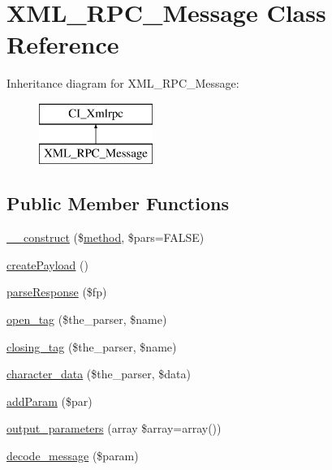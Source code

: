 \hypertarget{class_x_m_l___r_p_c___message}{}\section{X\+M\+L\+\_\+\+R\+P\+C\+\_\+\+Message Class Reference}
\label{class_x_m_l___r_p_c___message}
Inheritance diagram for X\+M\+L\+\_\+\+R\+P\+C\+\_\+\+Message\+:\begin{figure}[H]
\begin{center}
\leavevmode
\includegraphics[height=2.000000cm]{class_x_m_l___r_p_c___message}
\end{center}
\end{figure}
\subsection*{Public Member Functions}
\begin{DoxyCompactItemize}
\item 
\mbox{\hyperlink{class_x_m_l___r_p_c___message_ae3c3f62b3cd527a0c1fb4d45790fd825}{\+\_\+\+\_\+construct}} (\$\mbox{\hyperlink{class_c_i___xmlrpc_afd0597e1ae50c9e3ff42d23dcff82f71}{method}}, \$pars=F\+A\+L\+SE)
\item 
\mbox{\hyperlink{class_x_m_l___r_p_c___message_ac1398abb63f531a8c9ed9093895d9b42}{create\+Payload}} ()
\item 
\mbox{\hyperlink{class_x_m_l___r_p_c___message_a9ba8d8355497c83a5cc812c72c6f3f1d}{parse\+Response}} (\$fp)
\item 
\mbox{\hyperlink{class_x_m_l___r_p_c___message_ac0e9546e114f3888784003d49af0ce83}{open\+\_\+tag}} (\$the\+\_\+parser, \$name)
\item 
\mbox{\hyperlink{class_x_m_l___r_p_c___message_ada6db8b706d06d6a4b5151cbccdc2273}{closing\+\_\+tag}} (\$the\+\_\+parser, \$name)
\item 
\mbox{\hyperlink{class_x_m_l___r_p_c___message_a0fa11561c59ca8a01e7659954efbbb3e}{character\+\_\+data}} (\$the\+\_\+parser, \$data)
\item 
\mbox{\hyperlink{class_x_m_l___r_p_c___message_a2766a886f60c93f471ee0f11ae0d8729}{add\+Param}} (\$par)
\item 
\mbox{\hyperlink{class_x_m_l___r_p_c___message_ace57a1119edc3c02c0ec48c04eb5e58c}{output\+\_\+parameters}} (array \$array=array())
\item 
\mbox{\hyperlink{class_x_m_l___r_p_c___message_a52edbc413c7a84ef119f5f4bc2cefde3}{decode\+\_\+message}} (\$param)
\end{DoxyCompactItemize}
